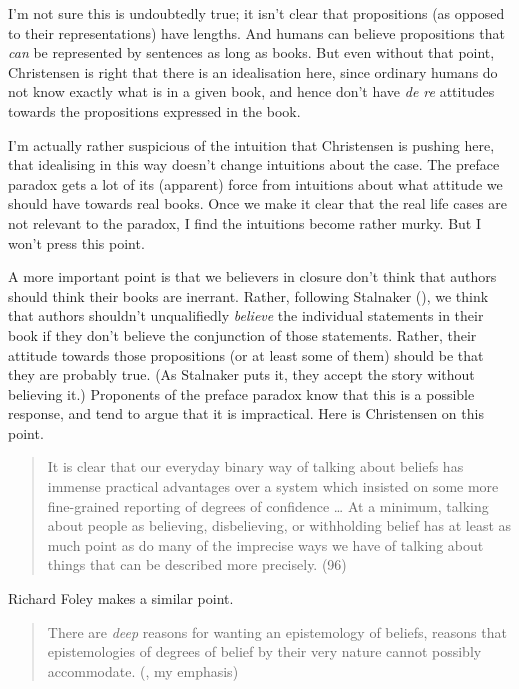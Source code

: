 \documentclass[
  10pt,
  letterpaper,
  DIV=11,
  numbers=noendperiod,
  twoside]{scrartcl}
\begin{document}
I'm not sure this is undoubtedly true; it isn't clear that propositions
(as opposed to their representations) have lengths. And humans can
believe propositions that \emph{can} be represented by sentences as long
as books. But even without that point, Christensen is right that there
is an idealisation here, since ordinary humans do not know exactly what
is in a given book, and hence don't have \emph{de re} attitudes towards
the propositions expressed in the book.

I'm actually rather suspicious of the intuition that Christensen is
pushing here, that idealising in this way doesn't change intuitions
about the case. The preface paradox gets a lot of its (apparent) force
from intuitions about what attitude we should have towards real books.
Once we make it clear that the real life cases are not relevant to the
paradox, I find the intuitions become rather murky. But I won't press
this point.

A more important point is that we believers in closure don't think that
authors should think their books are inerrant. Rather, following
Stalnaker (), we think that authors
shouldn't unqualifiedly \emph{believe} the individual statements in
their book if they don't believe the conjunction of those statements.
Rather, their attitude towards those propositions (or at least some of
them) should be that they are probably true. (As Stalnaker puts it, they
accept the story without believing it.) Proponents of the preface
paradox know that this is a possible response, and tend to argue that it
is impractical. Here is Christensen on this point.

\begin{quote}
It is clear that our everyday binary way of talking about beliefs has
immense practical advantages over a system which insisted on some more
fine-grained reporting of degrees of confidence \ldots{} At a minimum,
talking about people as believing, disbelieving, or withholding belief
has at least as much point as do many of the imprecise ways we have of
talking about things that can be described more precisely. (96)
\end{quote}

Richard Foley makes a similar point.

\begin{quote}
There are \emph{deep} reasons for wanting an epistemology of beliefs,
reasons that epistemologies of degrees of belief by their very nature
cannot possibly accommodate. (,
my emphasis)
\end{quote}
\end{document}
